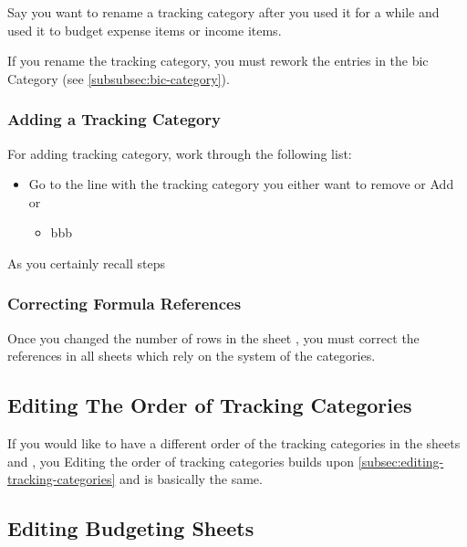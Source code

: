 Say you want to rename a tracking category after you used it for a while and used it to budget expense items or income items.
\begin{specialnote}
	If you rename the tracking category, you must rework the entries in the \ac{bic} Category (see \autoref{subsubsec:bic-category}).
\end{specialnote}


\subsubsection{Adding a Tracking Category}
\label{subsubsec:adding-a-tracking-category}

For adding tracking category, work through the following list:
\begin{itemize}
	\item Go to the line with the tracking category you either want to remove or Add or 
	\begin{itemize}
		\item bbb
	\end{itemize}
\end{itemize}
As you certainly recall steps 

\subsubsection{Correcting Formula References}
\label{subsubsec:correct-formula-references}

Once you changed the number of rows in the sheet , you must correct the references in all sheets which rely on the system of the categories.

\subsection{Editing The Order of Tracking Categories}
\label{subsec:editing-order-of-tracking-categories}

If you would like to have a different order of the tracking categories in the sheets  and , you 
Editing the order of tracking categories builds upon \autoref{subsec:editing-tracking-categories} and is basically the same.

\subsection{Editing Budgeting Sheets}
\label{subsec:editing-budgeting-sheets}

